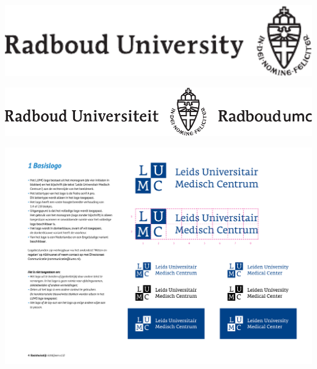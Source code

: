 \documentclass[a0,portrait]{a0poster}\usepackage[]{graphicx}\usepackage[svgnames]{xcolor}
\begin{document}
\hspace{5cm}\begin{minipage}[c]{0.25\linewidth}
\includegraphics[width=16cm]{logo-ru.pdf}

\vspace{1cm}

\hspace{0cm}\includegraphics[width=14cm]{radboudumc.pdf}

\vspace{1cm}

\includegraphics[width=16cm]{logo-lumc-black.pdf}
\end{minipage}

\vspace{2cm} %

\end{document}
